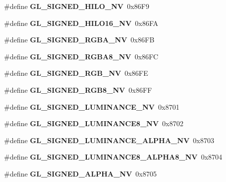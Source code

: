 \begin{DoxyCompactItemize}
\item 
\#define {\bfseries G\+L\+\_\+\+S\+I\+G\+N\+E\+D\+\_\+\+H\+I\+L\+O\+\_\+\+N\+V}~0x86\+F9\label{_s_d_l__opengl_8h_a7e2a8c8236572ee1d140c3470c16c9b9}

\item 
\#define {\bfseries G\+L\+\_\+\+S\+I\+G\+N\+E\+D\+\_\+\+H\+I\+L\+O16\+\_\+\+N\+V}~0x86\+F\+A\label{_s_d_l__opengl_8h_a206b48daa4b469e4d6d381f39b3eb053}

\item 
\#define {\bfseries G\+L\+\_\+\+S\+I\+G\+N\+E\+D\+\_\+\+R\+G\+B\+A\+\_\+\+N\+V}~0x86\+F\+B\label{_s_d_l__opengl_8h_a7356cb10f918aa1be5d11d5e71dca2c5}

\item 
\#define {\bfseries G\+L\+\_\+\+S\+I\+G\+N\+E\+D\+\_\+\+R\+G\+B\+A8\+\_\+\+N\+V}~0x86\+F\+C\label{_s_d_l__opengl_8h_ae439cb05f690ea13e36db44552dd83fb}

\item 
\#define {\bfseries G\+L\+\_\+\+S\+I\+G\+N\+E\+D\+\_\+\+R\+G\+B\+\_\+\+N\+V}~0x86\+F\+E\label{_s_d_l__opengl_8h_a86d2d2f006735de0b3e56f8aa89ea69c}

\item 
\#define {\bfseries G\+L\+\_\+\+S\+I\+G\+N\+E\+D\+\_\+\+R\+G\+B8\+\_\+\+N\+V}~0x86\+F\+F\label{_s_d_l__opengl_8h_ad98caca23dca937b7617cb9f7b31a939}

\item 
\#define {\bfseries G\+L\+\_\+\+S\+I\+G\+N\+E\+D\+\_\+\+L\+U\+M\+I\+N\+A\+N\+C\+E\+\_\+\+N\+V}~0x8701\label{_s_d_l__opengl_8h_a1adef2891d1f90dcafdb634d288f7049}

\item 
\#define {\bfseries G\+L\+\_\+\+S\+I\+G\+N\+E\+D\+\_\+\+L\+U\+M\+I\+N\+A\+N\+C\+E8\+\_\+\+N\+V}~0x8702\label{_s_d_l__opengl_8h_a8e27100cd5557260b8779cece3284881}

\item 
\#define {\bfseries G\+L\+\_\+\+S\+I\+G\+N\+E\+D\+\_\+\+L\+U\+M\+I\+N\+A\+N\+C\+E\+\_\+\+A\+L\+P\+H\+A\+\_\+\+N\+V}~0x8703\label{_s_d_l__opengl_8h_a58a01897ff7550e06335686b8fe0e048}

\item 
\#define {\bfseries G\+L\+\_\+\+S\+I\+G\+N\+E\+D\+\_\+\+L\+U\+M\+I\+N\+A\+N\+C\+E8\+\_\+\+A\+L\+P\+H\+A8\+\_\+\+N\+V}~0x8704\label{_s_d_l__opengl_8h_ac3db198753d3a9d475e0ec8c41136aa9}

\item 
\#define {\bfseries G\+L\+\_\+\+S\+I\+G\+N\+E\+D\+\_\+\+A\+L\+P\+H\+A\+\_\+\+N\+V}~0x8705\label{_s_d_l__opengl_8h_a9e8015b884e1998dbfb8411cf53237a3}


\end{DoxyCompactItemize}

